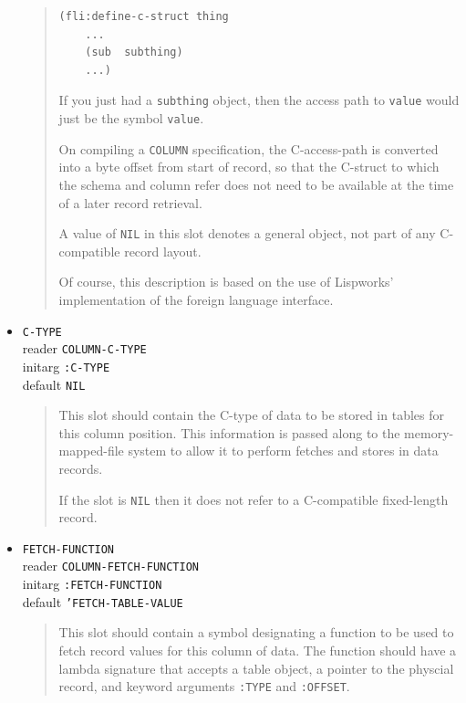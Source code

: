 \documentclass[article,oneside]{memoir}
\begin{document}
\begin{itemize}
\begin{quote}
\begin{verbatim}
(fli:define-c-struct thing
    ...
    (sub  subthing)
    ...)
\end{verbatim}
    
If you just had a \texttt{subthing} object, then the access path to \texttt{value} would just be the symbol \texttt{value}.

On compiling a \texttt{COLUMN} specification, the C-access-path is converted into a byte offset from start of record, so that the C-struct to which the schema and column refer does not need to be available at the time of a later record retrieval.

A value of \texttt{NIL} in this slot denotes a general object, not part of any C-compatible record layout.

Of course, this description is based on the use of Lispworks' implementation of the foreign language interface.
\end{quote}

   
\item \texttt{C-TYPE} \\ 
reader \texttt{COLUMN-C-TYPE} \\ 
initarg \texttt{:C-TYPE} \\ 
default \texttt{NIL}

\begin{quote}
This slot should contain the C-type of data to be stored in tables for this column position. This information is passed along to the memory-mapped-file system to allow it to perform fetches and stores in data records.

If the slot is \texttt{NIL} then it does not refer to a C-compatible fixed-length record.
\end{quote}

\item \texttt{FETCH-FUNCTION} \\ 
reader \texttt{COLUMN-FETCH-FUNCTION} \\ 
initarg \texttt{:FETCH-FUNCTION} \\ 
default \texttt{'FETCH-TABLE-VALUE}

\begin{quote}
This slot should contain a symbol designating a function to be used to fetch record values for this column of data. The function should have a lambda signature that accepts a table object, a pointer to the physcial record, and keyword arguments \texttt{:TYPE} and \texttt{:OFFSET}.


\end{quote}
\end{itemize}
\end{document}
